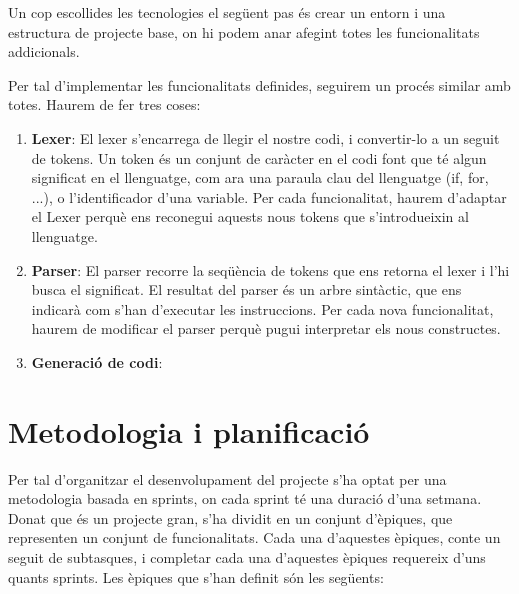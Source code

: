 ﻿\documentclass{article}
\begin{document}
Un cop escollides les tecnologies el següent pas és crear un entorn i una
estructura de projecte base, on hi podem anar afegint totes les funcionalitats
addicionals.

Per tal d'implementar les funcionalitats definides, seguirem un procés similar
amb totes. Haurem de fer tres coses:

\begin{enumerate}
    \item \textbf{Lexer}: El lexer s'encarrega de llegir el nostre codi, i
        convertir-lo a un seguit de tokens. Un token és un conjunt de caràcter
        en el codi font que té algun significat en el llenguatge, com ara una paraula
        clau del llenguatge (if, for, ...), o l'identificador d'una variable.
        Per cada funcionalitat, haurem d'adaptar el Lexer perquè ens reconegui
        aquests nous tokens que s'introdueixin al llenguatge.
    \item \textbf{Parser}: El parser recorre la seqüència de tokens que ens
        retorna el lexer i l'hi busca el significat. El resultat del parser és
        un arbre sintàctic, que ens indicarà com s'han d'executar les instruccions.
        Per cada nova funcionalitat, haurem de modificar el parser perquè pugui
        interpretar els nous constructes.
    \item \textbf{Generació de codi}:
\end{enumerate}


\section{Metodologia i planificació}
Per tal d'organitzar el desenvolupament del projecte s'ha optat per una metodologia
basada en sprints, on cada sprint té una duració d'una setmana. Donat que és un
projecte gran, s'ha dividit en un conjunt d'èpiques, que representen un conjunt
de funcionalitats. Cada una d'aquestes èpiques, conte un seguit de subtasques, i
completar cada una d'aquestes èpiques requereix d'uns quants sprints. Les èpiques
que s'han definit són les següents:
\end{document}

